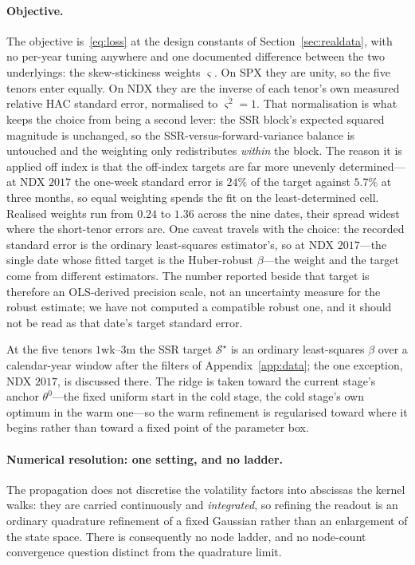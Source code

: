 \documentclass[11pt]{article}
\providecommand{\1}{\mathbf 1}
\begin{document}
\paragraph{Objective.} The objective is~\eqref{eq:loss} at the design constants of
Section~\ref{sec:realdata}, with no per-year tuning anywhere and one documented difference between
the two underlyings: the skew-stickiness weights $\varsigma$. On SPX they are unity, so the five
tenors enter equally. On NDX they are the inverse of each tenor's own measured relative HAC standard
error, normalised to $\overline{\varsigma^2}=1$. That normalisation is what keeps the choice from
being a second lever: the SSR block's expected squared magnitude is unchanged, so the
SSR-versus-forward-variance balance is untouched and the weighting only redistributes \emph{within}
the block. The reason it is applied off index is that the off-index targets are far more unevenly
determined---at NDX $2017$ the one-week standard error is $24\%$ of the target against $5.7\%$ at
three months, so equal weighting spends the fit on the least-determined cell. Realised weights run
from $0.24$ to $1.36$ across the nine dates, their spread widest where the short-tenor errors are.
One caveat travels with the choice: the recorded standard error is the ordinary least-squares
estimator's, so at NDX $2017$---the single date whose fitted target is the Huber-robust
$\beta$---the weight and the target come from different estimators. The number reported beside that
target is therefore an OLS-derived precision scale, not an uncertainty measure for the robust
estimate; we have not computed a compatible robust one, and it should not be read as that date's
target standard error.

At the five tenors $1$wk--$3$m the SSR target $\mathcal S^{\star}$ is an ordinary least-squares
$\beta$ over a calendar-year window after the filters of Appendix~\ref{app:data}; the one exception,
NDX $2017$, is discussed there. The ridge is taken toward the current stage's anchor
$\theta^{0}$---the fixed uniform start in the cold stage, the cold stage's own optimum in the warm
one---so the warm refinement is regularised toward where it begins rather than toward a fixed point
of the parameter box.

\paragraph{Numerical resolution: one setting, and no ladder.} The propagation does not discretise
the volatility factors into abscissas the kernel walks: they are carried continuously and
\emph{integrated}, so refining the readout is an ordinary quadrature refinement of a fixed Gaussian
rather than an enlargement of the state space. There is consequently no node ladder, and no
node-count convergence question distinct from the quadrature limit.
\end{document}
